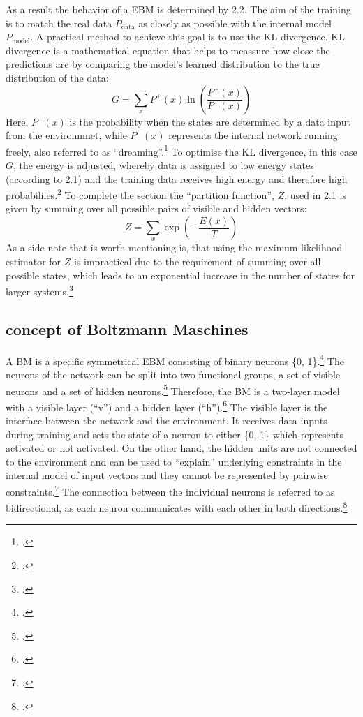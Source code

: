 As a result the behavior of a \ac{EBM} is determined by 2.2. 
The aim of the training is to match the real data \( P_{\text{data}} \) as closely as possible with the internal model \( P_{\text{model}} \).
A practical method to achieve this goal is to use the KL divergence. KL divergence is a mathematical equation that helps to meassure how close the predictions are by comparing the model's learned distribution to the true distribution of the data:
\begin{equation}
    G = \sum_x P^+(x) \ln \left( \frac{P^+(x)}{P^-(x)} \right)
\end{equation}
Here, \(P^+(x)\) is the probability when the states are determined by a data input from the environmnet, while \(P^-(x)\) represents the internal network running freely, also referred to as ``dreaming''.\footcite[Vgl.][154-155]{ackleyLearningAlgorithmBoltzmann1985}
To optimise the KL divergence, in this case \( G \), the energy is adjusted, whereby data is assigned to low energy states (according to 2.1) and the training data receives high energy and therefore high probabiliies.\footcite[Vgl.][2-3]{zhaiDeepStructuredEnergy2016}
To complete the section the ``partition function'', \( Z \), used in 2.1 is given by summing over all possible pairs of visible and hidden vectors:
\begin{equation}
    Z = \sum_x \exp\left(-\frac{E(x)}{T}\right)
\end{equation}
As a side note that is worth mentioning is, that using the maximum likelihood estimator for \( Z \) is impractical due to the requirement of summing over all possible states, which leads to an exponential increase in the number of states for larger systems.\footcite[Vgl.][2-3]{zhaiDeepStructuredEnergy2016}

\subsection{concept of Boltzmann Maschines}

A \ac{BM} is a specific symmetrical \ac{EBM} consisting of binary neurons \{0, 1\}.\footcite[Vgl.][260]{amariInformationGeometryBoltzmann1992}
The neurons of the network can be split into two functional groups, a set of visible neurons and a set of hidden neurons.\footcite[Vgl.][154]{ackleyLearningAlgorithmBoltzmann1985}
Therefore, the \ac{BM} is a two-layer model with a visible layer (``v'') and a hidden layer (``h'').\footcite[Vgl.][448]{salakhutdinovDeepBoltzmannMachines2009}
The visible layer is the interface between the network and the environment. It receives data inputs during training and sets the state of a neuron to either \{0, 1\} which represents activated or not activated.
On the other hand, the hidden units are not connected to the environment and can be used to “explain” underlying constraints in the internal model of input vectors and they cannot be represented by pairwise constraints.\footcite[Vgl.][154]{ackleyLearningAlgorithmBoltzmann1985}
The connection between the individual neurons is referred to as bidirectional, as each neuron communicates with each other in both directions.\footcite[Vgl.][149]{ackleyLearningAlgorithmBoltzmann1985}

